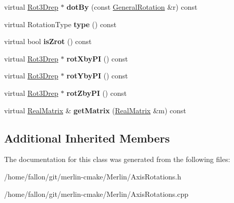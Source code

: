 \begin{DoxyCompactItemize}
virtual \hyperlink{classRot3Drep}{Rot3\+Drep} $\ast$ {\bfseries dot\+By} (const \hyperlink{classGeneralRotation}{General\+Rotation} \&r) const
\item 
\mbox{\label{classRotationZ_aada2bca49428ca464a34aef01d125c11}} 
virtual Rotation\+Type {\bfseries type} () const
\item 
\mbox{\label{classRotationZ_aa482472db431a8e1d2ed948874cbbc05}} 
virtual bool {\bfseries is\+Zrot} () const
\item 
\mbox{\label{classRotationZ_a05e8de3f89f862ca3a7eb760c271ece5}} 
virtual \hyperlink{classRot3Drep}{Rot3\+Drep} $\ast$ {\bfseries rot\+Xby\+PI} () const
\item 
\mbox{\label{classRotationZ_ada98cca2304ba299887c46c5eba58a29}} 
virtual \hyperlink{classRot3Drep}{Rot3\+Drep} $\ast$ {\bfseries rot\+Yby\+PI} () const
\item 
\mbox{\label{classRotationZ_a39e6060ab19ad24b23591de10dc5199d}} 
virtual \hyperlink{classRot3Drep}{Rot3\+Drep} $\ast$ {\bfseries rot\+Zby\+PI} () const
\item 
\mbox{\label{classRotationZ_ab03b725b3e081f60864d4c866e434435}} 
virtual \hyperlink{classTLAS_1_1Matrix}{Real\+Matrix} \& {\bfseries get\+Matrix} (\hyperlink{classTLAS_1_1Matrix}{Real\+Matrix} \&m) const
\end{DoxyCompactItemize}
\subsection*{Additional Inherited Members}


The documentation for this class was generated from the following files\+:\begin{DoxyCompactItemize}
\item 
/home/fallon/git/merlin-\/cmake/\+Merlin/Axis\+Rotations.\+h\item 
/home/fallon/git/merlin-\/cmake/\+Merlin/Axis\+Rotations.\+cpp\end{DoxyCompactItemize}
